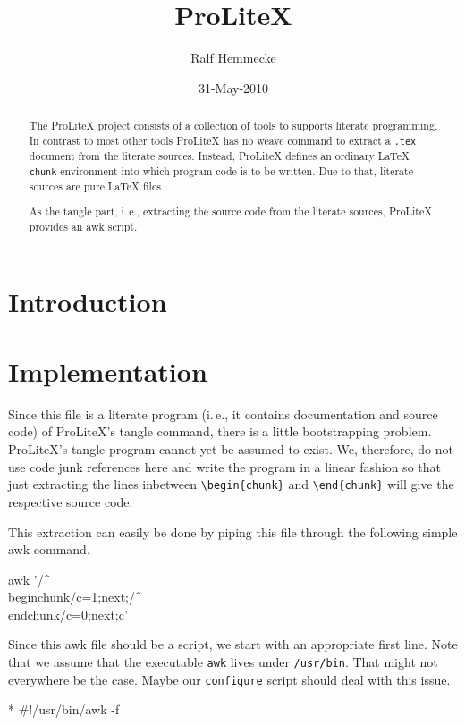 \documentclass[a4paper]{article} %
\newcommand{\packagename}[1]{{\normalfont\sffamily#1}}
\newcommand\ProLiteX{\textsf{ProLiteX}}
\newcommand{\ie}{i.\,e.}
\begin{document}
\title{\ProLiteX}
\date{31-May-2010}
\author{Ralf Hemmecke}
\maketitle
\begin{abstract}
  The \ProLiteX{} project consists of a collection of tools to
  supports literate programming. In contrast to most other tools
  \ProLiteX{} has no weave command to extract a \texttt{.tex} document
  from the literate sources. Instead, \ProLiteX{} defines an ordinary
  \LaTeX{} \texttt{chunk} environment into which program code is to be
  written. Due to that, literate sources are pure \LaTeX{} files.

  As the tangle part, \ie, extracting the source code from the
  literate sources, \ProLiteX{} provides an \packagename{awk} script.
\end{abstract}

\section{Introduction}

\section{Implementation}

Since this file is a literate program (\ie, it contains documentation
and source code) of \ProLiteX's tangle command, there is a little
bootstrapping problem. \ProLiteX's tangle program cannot yet be
assumed to exist. We, therefore, do not use code junk references here
and write the program in a linear fashion so that just extracting the
lines inbetween \verb|\begin{chunk}| and \verb|\end{chunk}| will give
the respective source code.

This extraction can easily be done by piping this file through the
following simple \packagename{awk} command.
\begin{myverbatim}
  awk '/^\\begin{chunk}/{c=1;next};/^\\end{chunk}/{c=0;next};c'
\end{myverbatim}

Since this \packagename{awk} file should be a script, we start with an
appropriate first line. Note that we assume that the executable
\texttt{awk} lives under \texttt{/usr/bin}. That might not everywhere
be the case. Maybe our \texttt{configure} script should deal with
this issue.
\begin{chunk}{*}
#!/usr/bin/awk -f
\end{chunk}
\end{document}
